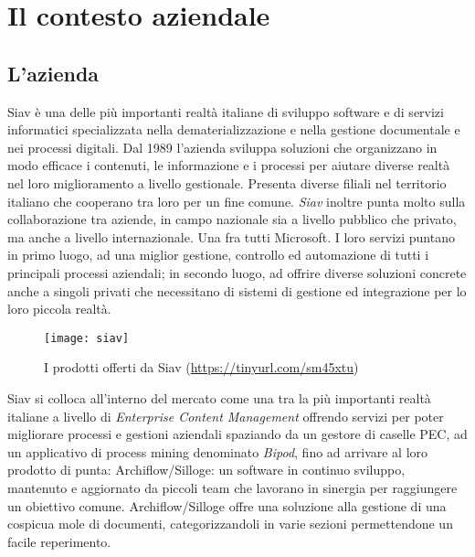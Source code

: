 
\chapter{Il contesto aziendale}
\label{cap:il-contesto-aziendale}
\section{L'azienda}
Siav è una delle più importanti realtà italiane di sviluppo software e di servizi informatici specializzata nella dematerializzazione e nella gestione documentale e nei processi digitali. Dal 1989 l'azienda sviluppa soluzioni che organizzano in modo efficace i contenuti, le informazione e i processi per aiutare diverse realtà nel loro miglioramento a livello gestionale. Presenta diverse filiali nel territorio italiano che cooperano tra loro per un fine comune. \textit{Siav} inoltre punta molto sulla collaborazione tra aziende, in campo nazionale sia a livello pubblico che privato, ma anche a livello internazionale. Una fra tutti Microsoft.
I loro servizi puntano in primo luogo, ad una miglior gestione, controllo ed automazione di tutti i principali processi aziendali; in secondo luogo, ad offrire diverse soluzioni concrete anche a singoli privati che necessitano di sistemi di gestione ed integrazione per lo loro piccola realtà.
\begin{figure}[!h] 
	\centering 
	\texttt{[image: siav]} 
	\caption{I prodotti offerti da Siav (\url{https://tinyurl.com/sm45xtu})}
\end{figure}
Siav si colloca all'interno del mercato come una tra la più importanti realtà italiane a livello di \textit{Enterprise Content Management} offrendo servizi per poter migliorare processi e gestioni aziendali spaziando da un gestore di caselle PEC, ad un applicativo di process mining denominato \textit{Bipod}, fino ad arrivare al loro prodotto di punta: Archiflow/Silloge: un software in continuo sviluppo, mantenuto e aggiornato da piccoli team che lavorano in sinergia per raggiungere un obiettivo comune. Archiflow/Silloge offre una soluzione alla gestione di una cospicua mole di documenti, categorizzandoli in varie sezioni permettendone un facile reperimento.
